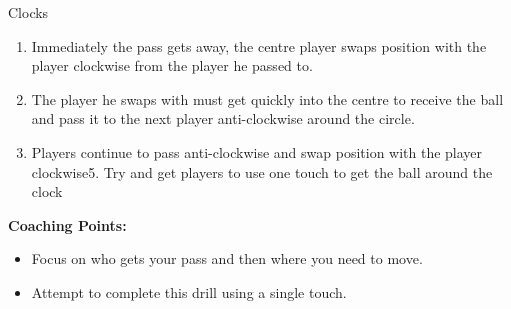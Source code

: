 \begin{evenBlock}{Clocks}
\begin{minipage}[t]{\linewidth}
\begin{minipage}{.6\linewidth}
\begin{enumerate}
        \item Immediately the pass gets away, the centre player swaps position with the player clockwise from the player he passed to.
        \item The player he swaps with must get quickly into the centre to receive the ball and pass it to the next player anti-clockwise around the circle.
        \item Players continue to pass anti-clockwise and swap position with the player clockwise5. Try and get players to use one touch to get the ball around the clock
        \end{enumerate}
    \end{minipage}
\end{minipage}

\textbf{Coaching Points:}
\begin{itemize}
    \setlength{\itemsep}{0pt}
    \setlength{\parskip}{0pt}
    \setlength{\parsep}{0pt}
    \item Focus on who gets your pass and then where you need to move.
    \item Attempt to complete this drill using a single touch.
\end{itemize}

\end{evenBlock}